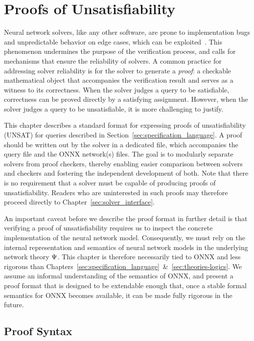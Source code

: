 \chapter{Proofs of Unsatisfiability}
\label{sec:proofs}

Neural network solvers, like any other software, are prone to implementation bugs and unpredictable behavior on edge cases, which can be exploited~\cite{jia2021exploiting}. This phenomenon undermines the purpose of the verification process, and calls for mechanisms that ensure the reliability of solvers.
A common practice for addressing solver reliability is for the solver to generate a \emph{proof}: a checkable mathematical object that accompanies the verification result and serves as a witness to its correctness. When the solver judges a query to be satisfiable, correctness can be proved directly by a satisfying assignment. However, when the solver judges a query 
to be unsatisfiable, it is more challenging to justify.

This chapter describes a standard format for expressing proofs of unsatisfiability (UNSAT) for \vnnlib{} queries described in Section~\ref{sec:specification_language}.
A proof should be written out by the solver in a dedicated file, which accompanies the \vnnlib{} query file and the ONNX network(s) files.
The goal is to modularly separate solvers from proof checkers, thereby enabling easier comparison between solvers and checkers and fostering the independent development of both.
Note that there is no requirement that a solver must be capable of producing proofs of unsatisfiability. Readers who are uninterested in such proofs may therefore proceed directly to Chapter~\ref{sec:solver_interface}.

An important caveat before we describe the proof format in further detail is that verifying a proof of unsatisfiability requires us to inspect the concrete implementation of the neural network model. 
Consequently, we must rely on the internal representation and semantics of neural network models in the underlying network theory $\Psi$. 
This chapter is therefore necessarily tied to ONNX and less rigorous than Chapters~\ref{sec:specification_language}~\&~\ref{sec:theories-logics}. 
We assume an informal understanding of the semantics of ONNX, and present a proof format that is designed to be extendable enough that, once a stable formal semantics for ONNX becomes available, it can be made fully rigorous in the future.

\section{Proof Syntax}
\label{sec:proof-syntax}

